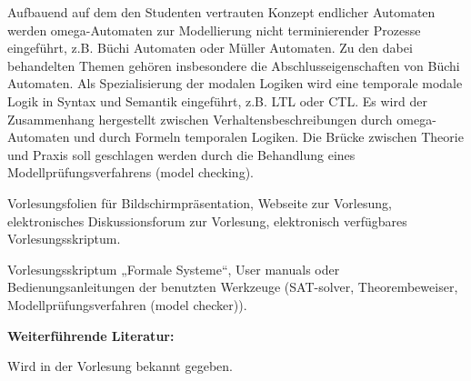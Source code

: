 \begin{course}
\begin{content}
\begin{itemize}
Aufbauend auf dem den Studenten vertrauten Konzept endlicher Automaten werden omega-Automaten zur Modellierung nicht terminierender Prozesse eingeführt, z.B. Büchi Automaten oder Müller Automaten. Zu den dabei behandelten Themen gehören insbesondere die Abschlusseigenschaften von Büchi Automaten.\newline
Als Spezialisierung der modalen Logiken wird eine temporale modale Logik in Syntax und Semantik eingeführt, z.B. LTL oder CTL.\newline
Es wird der Zusammenhang hergestellt zwischen Verhaltensbeschreibungen durch omega-Automaten und durch Formeln temporalen Logiken.\newline
Die Brücke zwischen Theorie und Praxis soll geschlagen werden durch die Behandlung eines Modellprüfungsverfahrens (model checking).  \end{itemize}
\end{content}

\begin{media}Vorlesungsfolien für Bildschirmpräsentation,\newline
Webseite zur Vorlesung,\newline
elektronisches Diskussionsforum zur Vorlesung,\newline
elektronisch verfügbares Vorlesungsskriptum.

\end{media}

\begin{literature}Vorlesungsskriptum „Formale Systeme“,\newline
User manuals oder Bedienungsanleitungen der benutzten Werkzeuge (SAT-solver, Theorembeweiser, Modellprüfungsverfahren (model checker)).

 

\textbf{Weiterführende Literatur:}

 

Wird in der Vorlesung bekannt gegeben.

\end{literature}



\end{course}